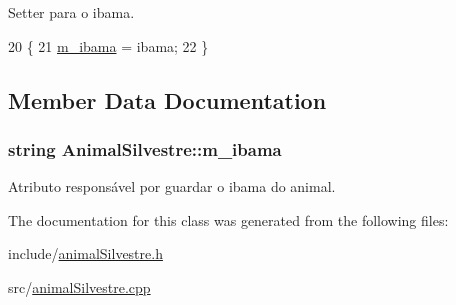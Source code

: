 Setter para o ibama. 


\begin{DoxyCode}
20 \{
21     \hyperlink{classAnimalSilvestre_a4c92c625318b23e550b8bb24fb934d14}{m\_ibama} = ibama;
22 \}
\end{DoxyCode}


\subsection{Member Data Documentation}
\subsubsection[{\texorpdfstring{m\+\_\+ibama}{m_ibama}}]{\setlength{\rightskip}{0pt plus 5cm}string Animal\+Silvestre\+::m\+\_\+ibama\hspace{0.3cm}{\ttfamily [protected]}}\hypertarget{classAnimalSilvestre_a4c92c625318b23e550b8bb24fb934d14}{}\label{classAnimalSilvestre_a4c92c625318b23e550b8bb24fb934d14}


Atributo responsável por guardar o ibama do animal. 



The documentation for this class was generated from the following files\+:\begin{DoxyCompactItemize}
\item 
include/\hyperlink{animalSilvestre_8h}{animal\+Silvestre.\+h}\item 
src/\hyperlink{animalSilvestre_8cpp}{animal\+Silvestre.\+cpp}\end{DoxyCompactItemize}
